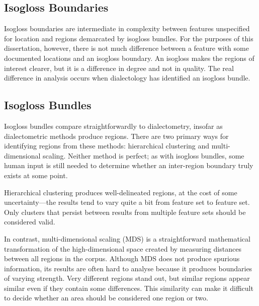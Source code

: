 
\subsection{Isogloss Boundaries}

Isogloss boundaries are intermediate in complexity between features unspecified
for location and regions demarcated by isogloss bundles. For the
purposes of this dissertation, however, there is not much difference
between a feature with some documented locations and an isogloss
boundary. An isogloss makes the regions of interest clearer, but it is
a difference in degree and not in quality. The real difference in
analysis occurs when dialectology has identified an isogloss bundle.

\subsection{Isogloss Bundles}

Isogloss bundles compare straightforwardly to dialectometry, insofar as
dialectometric methods produce regions. There are two primary ways for
identifying regions from these methods: hierarchical clustering and
multi-dimensional scaling. Neither method is perfect; as with isogloss
bundles, some human input is still needed to determine whether an
inter-region boundary truly exists at some point.

Hierarchical clustering
produces well-delineated regions, at the cost of some
uncertainty---the results tend to vary quite a bit from feature set to
feature set. Only clusters that persist between results from multiple
feature sets should be considered valid.

In contrast, multi-dimensional scaling (MDS) is a straightforward
mathematical transformation of the high-dimensional space created by
measuring distances between all regions in the corpus. Although MDS
does not produce spurious information, its results are often hard to
analyse because it produces boundaries of varying strength. Very
different regions stand out, but similar regions appear similar even
if they contain some differences. This similarity can make it
difficult to decide whether an area should be considered one region or
two.

